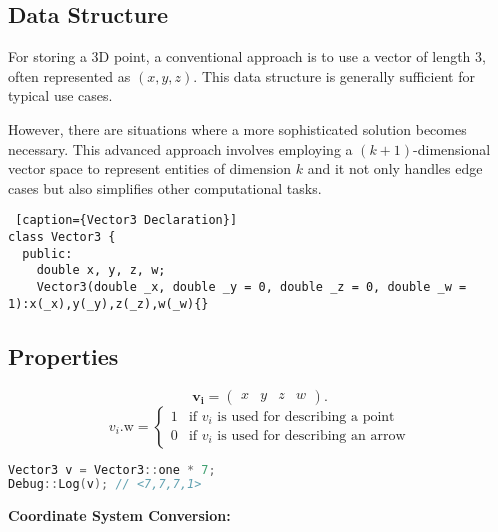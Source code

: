 




\subsection*{Data Structure}
For storing a 3D point, a conventional approach is to use a vector of length 3, often represented as $(x, y, z)$. This data structure is generally sufficient for typical use cases.

However, there are situations where a more sophisticated solution becomes necessary. This advanced approach 
involves employing a $(k+1)$-dimensional vector space to represent entities of dimension $k$
and it not only handles edge cases but also simplifies other computational tasks.

\begin{lstlisting} [caption={Vector3 Declaration}]
class Vector3 {
  public:
    double x, y, z, w;
    Vector3(double _x, double _y = 0, double _z = 0, double _w = 1):x(_x),y(_y),z(_z),w(_w){}
\end{lstlisting}



\subsection*{Properties}

\begin{minipage}{0.5\linewidth}

\begin{equation*}
    \mathbf{v_i} = \begin{pmatrix} x & y & z & w \end{pmatrix}.
    \end{equation*}
    \[
    \text{$v_i$.w} =
    \begin{cases}
        1 & \text{if $v_i$ is used for describing a point} \\
        0 & \text{if $v_i$ is used for describing an arrow}
    \end{cases}
    \]
    
\end{minipage}
\begin{minipage}{0.5\linewidth}
    \begin{lstlisting}[language=C++, caption={Vector3 Usage}]
Vector3 v = Vector3::one * 7;
Debug::Log(v); // <7,7,7,1>
    \end{lstlisting}
\end{minipage}

\begin{center}
  \textbf{Coordinate System Conversion:}
\end{center}

